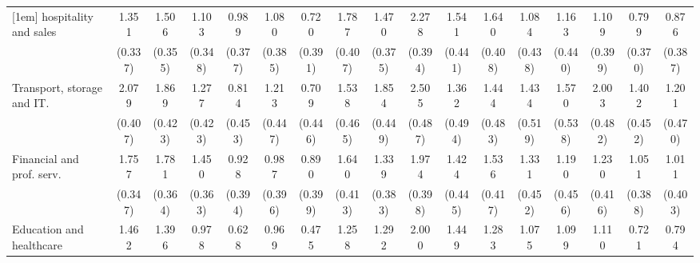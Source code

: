 {\begin{tabular}{l*{16}{c}}
[1em]
hospitality and sales&       1.351\sym{***}&       1.506\sym{***}&       1.103\sym{**} &       0.989\sym{**} &       1.080\sym{**} &       0.720         &       1.787\sym{***}&       1.470\sym{***}&       2.278\sym{***}&       1.541\sym{***}&       1.640\sym{***}&       1.084\sym{*}  &       1.163\sym{**} &       1.109\sym{**} &       0.799\sym{*}  &       0.876\sym{*}  \\
                    &     (0.337)         &     (0.355)         &     (0.348)         &     (0.377)         &     (0.385)         &     (0.391)         &     (0.407)         &     (0.375)         &     (0.394)         &     (0.441)         &     (0.408)         &     (0.438)         &     (0.440)         &     (0.399)         &     (0.370)         &     (0.387)         \\
[1em]
Transport, storage and IT.&       2.079\sym{***}&       1.869\sym{***}&       1.277\sym{**} &       0.814         &       1.213\sym{**} &       0.709         &       1.538\sym{***}&       1.854\sym{***}&       2.505\sym{***}&       1.362\sym{**} &       1.444\sym{**} &       1.434\sym{**} &       1.570\sym{**} &       2.003\sym{***}&       1.402\sym{**} &       1.201\sym{*}  \\
                    &     (0.407)         &     (0.423)         &     (0.423)         &     (0.453)         &     (0.447)         &     (0.446)         &     (0.465)         &     (0.449)         &     (0.487)         &     (0.494)         &     (0.483)         &     (0.519)         &     (0.538)         &     (0.482)         &     (0.452)         &     (0.470)         \\
[1em]
Financial and prof. serv.&       1.757\sym{***}&       1.781\sym{***}&       1.450\sym{***}&       0.928\sym{*}  &       0.987\sym{*}  &       0.890\sym{*}  &       1.640\sym{***}&       1.339\sym{***}&       1.974\sym{***}&       1.424\sym{**} &       1.536\sym{***}&       1.331\sym{**} &       1.190\sym{**} &       1.230\sym{**} &       1.051\sym{**} &       1.011\sym{*}  \\
                    &     (0.347)         &     (0.364)         &     (0.363)         &     (0.394)         &     (0.396)         &     (0.399)         &     (0.413)         &     (0.383)         &     (0.398)         &     (0.445)         &     (0.417)         &     (0.452)         &     (0.456)         &     (0.416)         &     (0.388)         &     (0.403)         \\
[1em]
Education and healthcare&       1.462\sym{***}&       1.396\sym{***}&       0.978\sym{**} &       0.628         &       0.969\sym{*}  &       0.475         &       1.258\sym{**} &       1.292\sym{***}&       2.000\sym{***}&       1.449\sym{**} &       1.283\sym{**} &       1.075\sym{*}  &       1.099\sym{*}  &       1.110\sym{**} &       0.721         &       0.794\sym{*}  \\

\end{tabular}}
